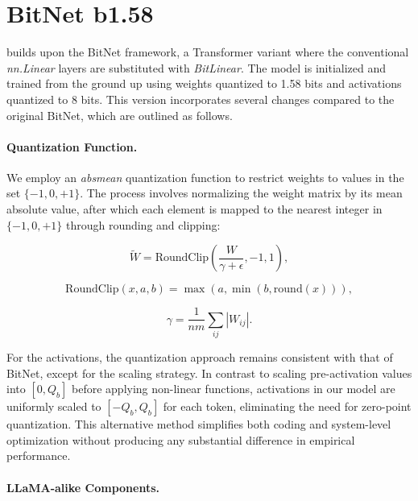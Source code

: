 \section{BitNet b1.58}

 builds upon the BitNet framework, a Transformer variant where the conventional \emph{nn.Linear} layers are substituted with \emph{BitLinear}. The model is initialized and trained from the ground up using weights quantized to 1.58 bits and activations quantized to 8 bits. This version incorporates several changes compared to the original BitNet, which are outlined as follows.

\paragraph{Quantization Function.} We employ an \emph{absmean} quantization function to restrict weights to values in the set $\{-1, 0, +1\}$. The process involves normalizing the weight matrix by its mean absolute value, after which each element is mapped to the nearest integer in $\{-1, 0, +1\}$ through rounding and clipping:

\begin{equation}
    \widetilde{W} = \mathrm{RoundClip}(\frac{W}{\gamma + \epsilon}, -1, 1),
\end{equation}

\begin{equation}
    \mathrm{RoundClip}(x, a, b) = \max(a, \min(b, \mathrm{round}(x))),
\end{equation}

\begin{equation}
    \gamma = \frac{1}{nm}\sum_{ij} |W_{ij}|.
\end{equation}

For the activations, the quantization approach remains consistent with that of BitNet, except for the scaling strategy. In contrast to scaling pre-activation values into $[0, Q_b]$ before applying non-linear functions, activations in our model are uniformly scaled to $[-Q_b, Q_b]$ for each token, eliminating the need for zero-point quantization. This alternative method simplifies both coding and system-level optimization without producing any substantial difference in empirical performance.

\paragraph{LLaMA-alike Components.}

